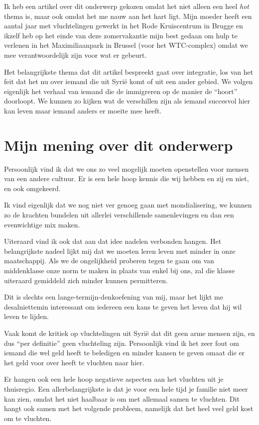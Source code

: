 \documentclass[12pt, a4paper]{paper}
\begin{document}
Ik heb een artikel over dit onderwerp gekozen omdat het niet alleen een heel \emph{hot} thema is, maar ook omdat het me nauw aan het hart ligt. Mijn moeder heeft een aantal jaar met vluchtelingen gewerkt in het Rode Kruiscentrum in Brugge en ikzelf heb op het einde van deze zomervakantie mijn best gedaan om hulp te verlenen in het Maximiliaanpark in Brussel (voor het WTC-complex) omdat we mee verantwoordelijk zijn voor wat er gebeurt.

Het belangrijkste thema dat dit artikel bespreekt gaat over integratie, los van het feit dat het nu over iemand die uit Syrië komt of uit een ander gebied. We volgen eigenlijk het verhaal van iemand die de immigreren op de manier de ``hoort'' doorloopt. We kunnen zo kijken wat de verschillen zijn als iemand succesvol hier kan leven maar iemand anders er moeite mee heeft.

\section{Mijn mening over dit onderwerp}

Persoonlijk vind ik dat we ons zo veel mogelijk moeten openstellen voor mensen van een andere cultuur. Er is een hele hoop kennis die wij hebben en zij en niet, en ook omgekeerd.

Ik vind eigenlijk dat we nog niet ver genoeg gaan met mondialisering, we kunnen zo de krachten bundelen uit allerlei verschillende samenlevingen en dan een evenwichtige mix maken.

Uiteraard vind ik ook dat aan dat idee nadelen verbonden hangen. Het belangrijkste nadeel lijkt mij dat we moeten leren leven met minder in onze maatschappij. Als we de ongelijkheid proberen tegen te gaan om van middenklasse onze norm te maken in plaats van enkel bij ons, zal die klasse uiteraard gemiddeld zich minder kunnen permitteren.

Dit is slechts een lange-termijn-denkoefening van mij, maar het lijkt me desalniettemin interessant om iedereen een kans te geven het leven dat hij wil leven te lijden.

Vaak komt de kritiek op vluchtelingen uit Syrië dat dit geen arme mensen zijn, en dus ``per definitie'' geen vluchteling zijn. Persoonlijk vind ik het zeer fout om iemand die wel geld heeft te beledigen en minder kansen te geven omaat die er het geld voor over heeft te vluchten naar hier.

Er hangen ook een hele hoop negatieve aspecten aan het vluchten uit je thuisregio. Een allerbelangrijkste is dat je voor een hele tijd je familie niet meer kan zien, omdat het niet haalbaar is om met allemaal samen te vluchten. Dit hangt ook samen met het volgende probleem, namelijk dat het heel veel geld kost om te vluchten.
\end{document}
